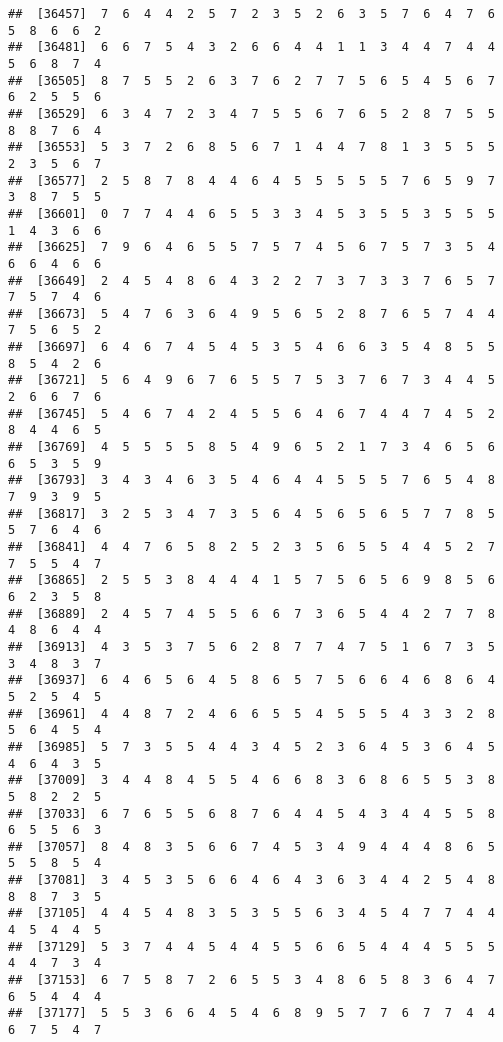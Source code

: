 \documentclass[
]{book}
\begin{document}
\begin{verbatim}
##  [36457]  7  6  4  4  2  5  7  2  3  5  2  6  3  5  7  6  4  7  6  5  8  6  6  2
##  [36481]  6  6  7  5  4  3  2  6  6  4  4  1  1  3  4  4  7  4  4  5  6  8  7  4
##  [36505]  8  7  5  5  2  6  3  7  6  2  7  7  5  6  5  4  5  6  7  6  2  5  5  6
##  [36529]  6  3  4  7  2  3  4  7  5  5  6  7  6  5  2  8  7  5  5  8  8  7  6  4
##  [36553]  5  3  7  2  6  8  5  6  7  1  4  4  7  8  1  3  5  5  5  2  3  5  6  7
##  [36577]  2  5  8  7  8  4  4  6  4  5  5  5  5  5  7  6  5  9  7  3  8  7  5  5
##  [36601]  0  7  7  4  4  6  5  5  3  3  4  5  3  5  5  3  5  5  5  1  4  3  6  6
##  [36625]  7  9  6  4  6  5  5  7  5  7  4  5  6  7  5  7  3  5  4  6  6  4  6  6
##  [36649]  2  4  5  4  8  6  4  3  2  2  7  3  7  3  3  7  6  5  7  7  5  7  4  6
##  [36673]  5  4  7  6  3  6  4  9  5  6  5  2  8  7  6  5  7  4  4  7  5  6  5  2
##  [36697]  6  4  6  7  4  5  4  5  3  5  4  6  6  3  5  4  8  5  5  8  5  4  2  6
##  [36721]  5  6  4  9  6  7  6  5  5  7  5  3  7  6  7  3  4  4  5  2  6  6  7  6
##  [36745]  5  4  6  7  4  2  4  5  5  6  4  6  7  4  4  7  4  5  2  8  4  4  6  5
##  [36769]  4  5  5  5  5  8  5  4  9  6  5  2  1  7  3  4  6  5  6  6  5  3  5  9
##  [36793]  3  4  3  4  6  3  5  4  6  4  4  5  5  5  7  6  5  4  8  7  9  3  9  5
##  [36817]  3  2  5  3  4  7  3  5  6  4  5  6  5  6  5  7  7  8  5  5  7  6  4  6
##  [36841]  4  4  7  6  5  8  2  5  2  3  5  6  5  5  4  4  5  2  7  7  5  5  4  7
##  [36865]  2  5  5  3  8  4  4  4  1  5  7  5  6  5  6  9  8  5  6  6  2  3  5  8
##  [36889]  2  4  5  7  4  5  5  6  6  7  3  6  5  4  4  2  7  7  8  4  8  6  4  4
##  [36913]  4  3  5  3  7  5  6  2  8  7  7  4  7  5  1  6  7  3  5  3  4  8  3  7
##  [36937]  6  4  6  5  6  4  5  8  6  5  7  5  6  6  4  6  8  6  4  5  2  5  4  5
##  [36961]  4  4  8  7  2  4  6  6  5  5  4  5  5  5  4  3  3  2  8  5  6  4  5  4
##  [36985]  5  7  3  5  5  4  4  3  4  5  2  3  6  4  5  3  6  4  5  4  6  4  3  5
##  [37009]  3  4  4  8  4  5  5  4  6  6  8  3  6  8  6  5  5  3  8  5  8  2  2  5
##  [37033]  6  7  6  5  5  6  8  7  6  4  4  5  4  3  4  4  5  5  8  6  5  5  6  3
##  [37057]  8  4  8  3  5  6  6  7  4  5  3  4  9  4  4  4  8  6  5  5  5  8  5  4
##  [37081]  3  4  5  3  5  6  6  4  6  4  3  6  3  4  4  2  5  4  8  8  8  7  3  5
##  [37105]  4  4  5  4  8  3  5  3  5  5  6  3  4  5  4  7  7  4  4  4  5  4  4  5
##  [37129]  5  3  7  4  4  5  4  4  5  5  6  6  5  4  4  4  5  5  5  4  4  7  3  4
##  [37153]  6  7  5  8  7  2  6  5  5  3  4  8  6  5  8  3  6  4  7  6  5  4  4  4
##  [37177]  5  5  3  6  6  4  5  4  6  8  9  5  7  7  6  7  7  4  4  6  7  5  4  7

\end{verbatim}
\end{document}
